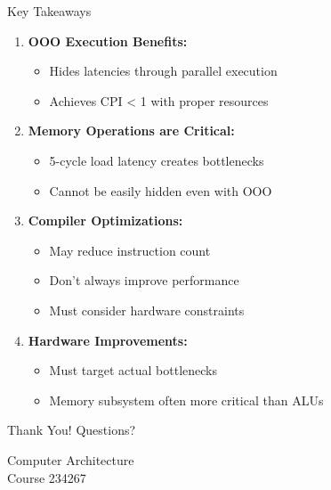 \documentclass[aspectratio=169,12pt]{beamer}
\begin{document}
\begin{frame}{Key Takeaways}
\begin{enumerate}
    \item \textbf{OOO Execution Benefits:}
    \begin{itemize}
        \item Hides latencies through parallel execution
        \item Achieves CPI < 1 with proper resources
    \end{itemize}
    
    \item \textbf{Memory Operations are Critical:}
    \begin{itemize}
        \item 5-cycle load latency creates bottlenecks
        \item Cannot be easily hidden even with OOO
    \end{itemize}
    
    \item \textbf{Compiler Optimizations:}
    \begin{itemize}
        \item May reduce instruction count
        \item Don't always improve performance
        \item Must consider hardware constraints
    \end{itemize}
    
    \item \textbf{Hardware Improvements:}
    \begin{itemize}
        \item Must target actual bottlenecks
        \item Memory subsystem often more critical than ALUs
    \end{itemize}
\end{enumerate}
\end{frame}

\begin{frame}{Thank You!}
\centering
\Large Questions?

\vspace{1cm}

\normalsize
Computer Architecture\\
Course 234267
\end{frame}
\end{document}
